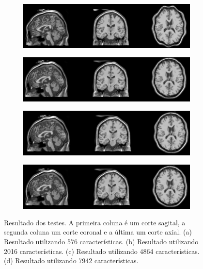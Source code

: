 \begin{figure}[H]
    \centering
    \begin{subfigure}[t]{0.5\textwidth}
      \includegraphics[width=\textwidth]{figuras/result001.png}
      \label{fig:unequalizedImage}
    \end{subfigure}
    \begin{subfigure}[t]{0.5\textwidth}
      \includegraphics[width=\textwidth]{figuras/result002.png}
      \label{fig:equalizedImage}
    \end{subfigure}
    \begin{subfigure}[t]{0.5\textwidth}
      \includegraphics[width=\textwidth]{figuras/result003.png}
      \label{fig:equalizedImage}
    \end{subfigure}
    \begin{subfigure}[t]{0.5\textwidth}
      \includegraphics[width=\textwidth]{figuras/result004.png}
      \label{fig:equalizedImage}
    \end{subfigure}
    \caption{Resultado dos testes. A primeira coluna é um corte sagital,
             a segunda coluna um corte coronal e a última um corte axial.
             (a) Resultado utilizando 576 características.
             (b) Resultado utilizando 2016 características.
             (c) Resultado utilizando 4864 características.
             (d) Resultado utilizando 7942 características.}
    \label{fig:equalization}
\end{figure}
